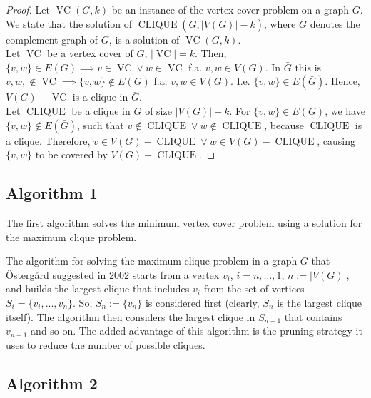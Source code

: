 \documentclass[11pt,a4paper]{article}
\DeclareMathOperator{\VC}{VC}
\DeclareMathOperator{\CLIQUE}{CLIQUE}
\begin{document}
\begin{proof}
Let $\VC(G, k)$ be an instance of the vertex cover problem on a graph $G$. We state that the solution of $\CLIQUE(\bar G, |V(G)|-k)$, where $\bar G$ denotes the complement graph of $G$, is a solution of $\VC(G, k)$. \\

Let $\VC$ be a vertex cover of $G$, $|\VC| = k$. Then, $\{v,w\} \in E(G) \implies v \in \VC \lor w \in \VC$ f.a. $v,w \in V(G)$. In $\bar G$ this is $v,w, \not \in \VC \implies \{v,w\} \not \in E(G)$ f.a. $v,w \in V(G)$. I.e. $\{v,w\} \in E(\bar G)$. Hence, $V(G) - \VC$ is a clique in $\bar G$. \\

Let $\CLIQUE$ be a clique in $\bar G$ of size $|V(G)|-k$. For $\{v,w\} \in E(G)$, we have $\{v,w\} \not \in E(\bar G)$, such that $v \not \in \CLIQUE \lor w \not \in \CLIQUE$, because $\CLIQUE$ is a clique. Therefore, $v \in V(G) - \CLIQUE \lor w \in V(G) - \CLIQUE$, causing $\{v,w\}$ to be covered by $V(G) - \CLIQUE$.
\end{proof}

\subsection{Algorithm 1}
The first algorithm solves the minimum vertex cover problem using a solution for the maximum clique problem.

The algorithm for solving the maximum clique problem in a graph $G$ that Östergård suggested in 2002 starts from a vertex $v_i$, $i=n, \dots, 1$, $n :=|V(G)|$, and builds the largest clique that includes $v_i$ from the set of vertices $S_i = \{v_i, ..., v_n\}$. So, $S_n := \{v_n\}$ is considered first (clearly, $S_n$ is the largest clique itself). The algorithm then considers the largest clique in $S_{n-1}$ that contains $v_{n-1}$ and so on. The added advantage of this algorithm is the pruning strategy it uses to reduce the number of possible cliques.


\subsection{Algorithm 2}
\end{document}
